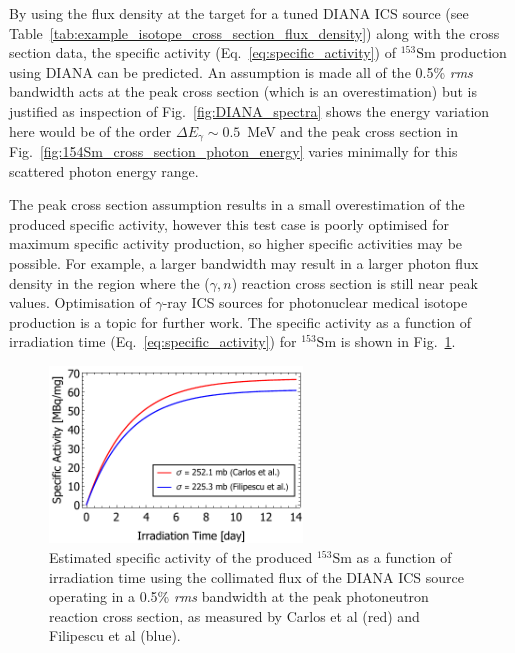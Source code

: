 \documentclass[../main.tex]{subfiles}
\begin{document}
By using the flux density at the target for a tuned DIANA ICS source (see Table~\ref{tab:example_isotope_cross_section_flux_density}) along with the cross section data, the specific activity (Eq.~\ref{eq:specific_activity}) of $^{153}\mathrm{Sm}$ production using DIANA can be predicted. An assumption is made all of the 0.5\% \textit{rms} bandwidth acts at the peak cross section (which is an overestimation) but is justified as inspection of Fig.~\ref{fig:DIANA_spectra} shows the energy variation here would be of the order $\Delta E_{\gamma}\sim0.5$~\si{\mega\electronvolt} and the peak cross section in Fig.~\ref{fig:154Sm_cross_section_photon_energy} varies minimally for this scattered photon energy range. 

The peak cross section assumption results in a small overestimation of the produced specific activity, however this test case is poorly optimised for maximum specific activity production, so higher specific activities may be possible. For example, a larger bandwidth may result in a larger photon flux density in the region where the ($\gamma,n$) reaction cross section is still near peak values. Optimisation of $\gamma$-ray ICS sources for photonuclear medical isotope production is a topic for further work. The specific activity as a function of irradiation time (Eq.~\ref{eq:specific_activity}) for $^{153}\mathrm{Sm}$ is shown in Fig.~\ref{fig:153Sm_specific_activity}.
\begin{figure}[!h]
\centering
\includegraphics[width=0.6\textwidth]{Figures/DIANA_Inverse_Compton_Source_Design/154Sm_specific_activity.pdf}
\caption{Estimated specific activity of the produced $^{153}\mathrm{Sm}$ as a function of irradiation time using the collimated flux of the DIANA ICS source operating in a 0.5\% \textit{rms} bandwidth at the peak photoneutron reaction cross section, as measured by Carlos et al \cite{carlos1974giant} (red) and Filipescu et al \cite{filipescu2014photoneutron} (blue).}
\label{fig:153Sm_specific_activity}
\end{figure}
\end{document}
